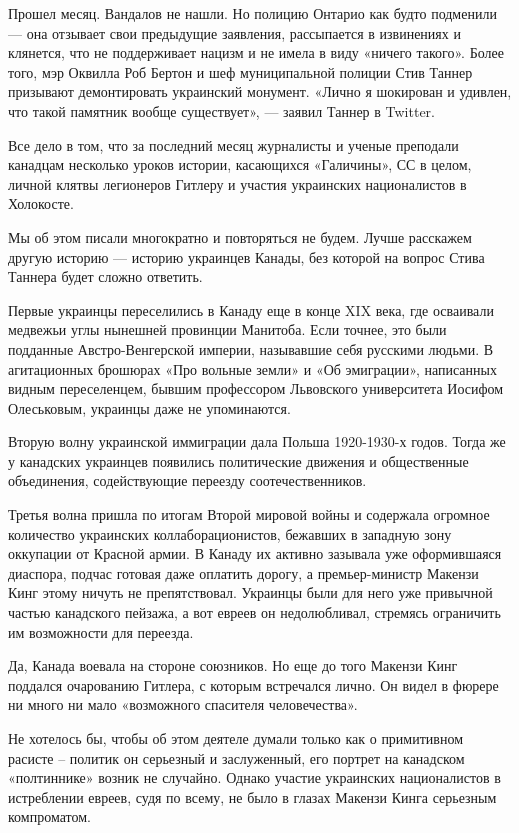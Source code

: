 Прошел месяц. Вандалов не нашли. Но полицию Онтарио как будто подменили --- она
отзывает свои предыдущие заявления, рассыпается в извинениях и клянется, что не
поддерживает нацизм и не имела в виду «ничего такого». Более того, мэр Оквилла
Роб Бертон и шеф муниципальной полиции Стив Таннер призывают демонтировать
украинский монумент. «Лично я шокирован и удивлен, что такой памятник вообще
существует», --- заявил Таннер в Twitter.

Все дело в том, что за последний месяц журналисты и ученые преподали канадцам
несколько уроков истории, касающихся «Галичины», СС в целом, личной клятвы
легионеров Гитлеру и участия украинских националистов в Холокосте.

Мы об этом писали многократно и повторяться не будем. Лучше расскажем другую
историю --- историю украинцев Канады, без которой на вопрос Стива Таннера будет
сложно ответить.

Первые украинцы переселились в Канаду еще в конце XIX века, где осваивали
медвежьи углы нынешней провинции Манитоба. Если точнее, это были подданные
Австро-Венгерской империи, называвшие себя русскими людьми. В агитационных
брошюрах «Про вольные земли» и «Об эмиграции», написанных видным переселенцем,
бывшим профессором Львовского университета Иосифом Олеськовым, украинцы даже не
упоминаются.

Вторую волну украинской иммиграции дала Польша 1920-1930-х годов. Тогда же у
канадских украинцев появились политические движения и общественные объединения,
содействующие переезду соотечественников.

Третья волна пришла по итогам Второй мировой войны и содержала огромное
количество украинских коллаборационистов, бежавших в западную зону оккупации от
Красной армии. В Канаду их активно зазывала уже оформившаяся диаспора, подчас
готовая даже оплатить дорогу, а премьер-министр Макензи Кинг этому ничуть не
препятствовал. Украинцы были для него уже привычной частью канадского пейзажа,
а вот евреев он недолюбливал, стремясь ограничить им возможности для переезда.

Да, Канада воевала на стороне союзников. Но еще до того Макензи Кинг поддался
очарованию Гитлера, с которым встречался лично. Он видел в фюрере ни много ни
мало «возможного спасителя человечества».

Не хотелось бы, чтобы об этом деятеле думали только как о примитивном расисте –
политик он серьезный и заслуженный, его портрет на канадском «полтиннике»
возник не случайно. Однако участие украинских националистов в истреблении
евреев, судя по всему, не было в глазах Макензи Кинга серьезным компроматом.

